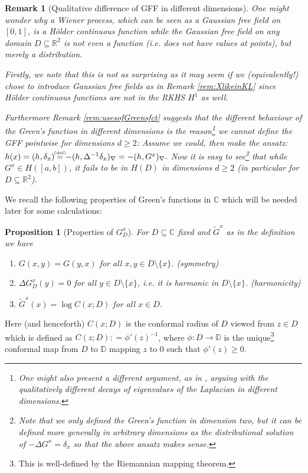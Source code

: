 \documentclass[11pt,reqno]{amsart}
\numberwithin{equation}{section}
\newtheorem{pro}[thm]{Proposition}
\newtheorem{rem}[thm]{Remark}
\newcommand{\eqbydef}{\mathrel{\stackrel{\hspace*{-3mm}\text{\tiny(def)}\hspace*{-3mm}}{=}}}
\newcommand{\deq}{\mathrel{\mathop:}=}
\begin{document}
\begin{rem}[Qualitative difference of GFF in different dimensions]
	One might wonder why a Wiener process, which can be seen as a Gaussian free field on $[0,1]$, is a H\"older continuous function while the Gaussian free field on any domain $D\subseteq \mathbb R^2$ is not even a function (i.e. does not have values at points), but merely a distribution.
	
	Firstly, we note that this is not as surprising as it may seem if we (equivalently!) chose to introduce Gaussian free fields as in Remark \ref{rem:XlikeinKL} since H\"older continuous functions are not in the RKHS $H^1$ as well.
	
	Furthermore Remark \ref{rem:usesofGreensfct} suggests that the different behaviour of the Green's function in different dimensions is the reason\footnote{One might also present a different argument, as in \cite{She07}, arguing with the qualitatively different decays of eigenvalues of the Laplacian in different dimensions.} we cannot define the GFF pointwise for dimensions $d\geq 2$: Assume we could, then make the ansatz: $h(x)=(h,\delta_x)\eqbydef -(h,\Delta^{-1}\delta_x)_\nabla = -(h,G^x)_\nabla.$ Now it is easy to see\footnote{Note that we only defined the Green's function in dimension two, but it can be defined more generally in arbitrary dimensions as the distributional solution of $-\Delta G^x=\delta_x$ so that the above ansatz makes sense.} that while $G^x\in H([a,b])$, it fails to be in $H(D)$ in dimensions $d\geq 2$ (in particular for $D\subseteq\mathbb R^2$).
\end{rem}

We recall the following properties of Green's functions in $\mathbb C$ which will be needed later for some calculations:

\begin{pro}[Properties of $G_D^x$]\label{prop:propertiesofGreensfcts} For $D\subseteq\mathbb C$ fixed and $\tilde G^x$ as in the definition we have
	\begin{enumerate}
		\item $G(x,y) = G(y,x)$ for all $x,y\in D\setminus\{x\}$. (symmetry)
		\item $\Delta G_D^x(y)=0$ for all $y\in D\setminus\{x\}$, i.e. it is harmonic in $D\setminus\{x\}$. (harmonicity)
		\item\label{item:GreensfctatXisconfRadius} $\tilde G^x(x)=\log C(x;D)$ for all $x\in D$.
	\end{enumerate}
\end{pro}
Here (and henceforth) $C(x;D)$ is the conformal radius of $D$ viewed from $z\in D$ which is defined as $C(z;D)\deq \phi'(z)^{-1}$, where $\phi:D\rightarrow\mathbb D$ is the unique\footnote{This is well-defined by the Riemannian mapping theorem.} conformal map from $D$ to $\mathbb D$ mapping $z$ to $0$ such that $\phi'(z)\geq 0$.
\end{document}
